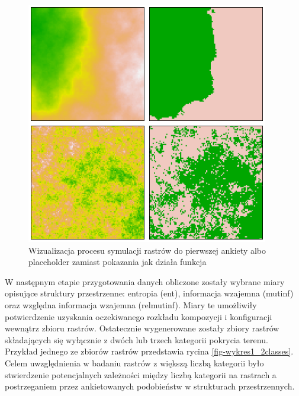 \documentclass{amuthesis}
\begin{document}
\begin{figure}[t]

{\centering \includegraphics[width=4.16667in,height=4.16667in]{figures/wykres2_gen.png}

}

\caption{\label{fig-wykres2_gen}Wizualizacja procesu symulacji rastrów
do pierwszej ankiety albo placeholder zamiast pokazania jak działa
funkcja}

\end{figure}

W następnym etapie przygotowania danych obliczone zostały wybrane miary
opisujące struktury przestrzenne: entropia (ent), informacja wzajemna
(mutinf) oraz względna informacja wzajemna (relmutinf). Miary te
umożliwiły potwierdzenie uzyskania oczekiwanego rozkładu kompozycji i
konfiguracji wewnątrz zbioru rastrów. Ostatecznie wygenerowane zostały
zbiory rastrów składających się wyłącznie z dwóch lub trzech kategorii
pokrycia terenu. Przykład jednego ze zbiorów rastrów przedstawia rycina
\ref{fig-wykres1_2classes}. Celem uwzględnienia w badaniu rastrów z
większą liczbą kategorii było stwierdzenie potencjalnych zależności
między liczbą kategorii na rastrach a postrzeganiem przez ankietowanych
podobieństw w strukturach przestrzennych.
\end{document}

